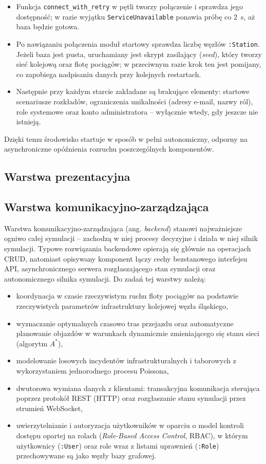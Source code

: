 \documentclass[twoside]{projektInzynierskiMS1z}
\begin{document}
\begin{itemize}
    \item Funkcja \texttt{connect\_with\_retry} w pętli tworzy połączenie
    i sprawdza jego dostępność; w razie wyjątku \texttt{ServiceUnavailable}
    ponawia próbę co 2~s, aż baza będzie gotowa.
    \item Po nawiązaniu połączenia moduł startowy sprawdza liczbę węzłów
    \texttt{:Station}. Jeżeli baza jest pusta, uruchamiany jest skrypt
    zasilający (\emph{seed}), który tworzy sieć kolejową oraz flotę pociągów;
    w przeciwnym razie krok ten jest pomijany, co zapobiega nadpisaniu danych
    przy kolejnych restartach.
    \item Następnie przy każdym starcie zakładane są brakujące elementy:
    startowe scenariusze rozkładów, ograniczenia unikalności (adresy e-mail,
    nazwy ról), role systemowe oraz konto administratora -- wyłącznie wtedy,
    gdy jeszcze nie istnieją.
\end{itemize}
Dzięki temu środowisko startuje w sposób w pełni autonomiczny, odporny na asynchroniczne opóźnienia rozruchu poszczególnych komponentów.   

\subsection{Warstwa prezentacyjna}
\subsection{Warstwa komunikacyjno-zarządzająca}
Warstwa komunikacyjno-zarządzająca (ang. \emph{backend}) stanowi najważniejsze
ogniwo całej symulacji -- zachodzą w niej procesy decyzyjne i działa w niej
silnik symulacji. Typowe rozwiązania backendowe opierają się głównie na
operacjach CRUD, natomiast opisywany komponent łączy cechy bezstanowego
interfejsu API, asynchronicznego serwera rozgłaszającego stan symulacji oraz
autonomicznego silnika symulacji. Do zadań tej warstwy należą:
\begin{itemize}
    \item koordynacja w czasie rzeczywistym ruchu floty pociągów na podstawie rzeczywistych parametrów infrastruktury kolejowej węzła śląskiego,
    \item wyznaczanie optymalnych czasowo tras przejazdu oraz automatyczne planowanie objazdów w warunkach dynamicznie zmieniającego się stanu sieci (algorytm $A^*$),
    \item modelowanie losowych incydentów infrastrukturalnych i taborowych z wykorzystaniem jednorodnego procesu Poissona,
    \item dwutorowa wymiana danych z klientami: transakcyjna komunikacja sterująca poprzez protokół REST (HTTP) oraz rozgłaszanie stanu symulacji przez strumień WebSocket,
    \item uwierzytelnianie i autoryzacja użytkowników w oparciu o model kontroli
    dostępu opartej na rolach (\emph{Role-Based Access Control}, RBAC), w którym
    użytkownicy (\texttt{:User}) oraz role wraz z listami uprawnień
    (\texttt{:Role}) przechowywane są jako węzły bazy grafowej.
\end{itemize}
\end{document}
